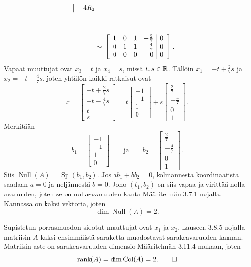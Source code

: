 \documentclass[11pt,a4paper]{amsart}
\begin{document}
\begin{solution}
\[\begin{aligned}
\begin{array}{@{}l@{}}
        \smash{\rowop{-4R_2}} \\
        \vphantom{\frac47}{} \\
        {}
      \end{array}
      \\[1ex]
      &\sim{}
      \left[
        \begin{array}{rrrr|r}
          1 & 0 & 1 & -\frac27 & 0 \\
          0 & 1 & 1 & \frac47 & 0 \\
          0 & 0 & 0 & 0 & 0
        \end{array}
      \right].
    \end{aligned}
  \]
  Vapaat muuttujat ovat \(x_3=t\) ja \(x_4=s\), missä
  \(t,s\in\mathbb{R}\). Tällöin \(x_1=-t+\frac27s\) ja
  \(x_2=-t-\frac47s\), joten yhtälön kaikki ratkaisut ovat
  \[
    x=
    \begin{bmatrix}
      -t+\frac27s \\ -t-\frac47s \\ t \\ s
    \end{bmatrix}
    =t
    \begin{bmatrix}-1 \\ -1 \\ 1 \\ 0
    \end{bmatrix}
    +s
    \begin{bmatrix}\frac27 \\ -\frac47 \\ 0 \\ 1
    \end{bmatrix}.
  \]
  Merkitään
  \[
    b_1=
    \begin{bmatrix}-1 \\ -1 \\ 1 \\ 0
    \end{bmatrix}
    \qquad\text{ja}\qquad
    b_2=
    \begin{bmatrix}\frac27 \\ -\frac47 \\ 0 \\ 1
    \end{bmatrix}.
  \]
  Siis \(\operatorname{Null}(A)=\operatorname{Sp}(b_1,b_2)\).
  Jos \(ab_1+bb_2=0\), kolmannesta koordinaatista saadaan \(a=0\)
  ja neljännestä \(b=0\). Jono \((b_1,b_2)\) on siis vapaa ja
  virittää nolla-avaruuden, joten se on nolla-avaruuden kanta
  Määritelmän 3.7.1 nojalla. Kannassa on kaksi vektoria, joten
  \[
    \dim\operatorname{Null}(A)=2.
  \]

  Supistetun porrasmuodon sidotut muuttujat ovat \(x_1\) ja \(x_2\).
  Lauseen 3.8.5 nojalla matriisin \(A\) kaksi ensimmäistä saraketta
  muodostavat sarakeavaruuden kannan. Matriisin aste on sarakeavaruuden
  dimensio Määritelmän 3.11.4 mukaan, joten
  \[
    \operatorname{rank}(A)=\dim\operatorname{Col}(A)=2.\qedhere
  \]
\end{solution}
\end{document}
